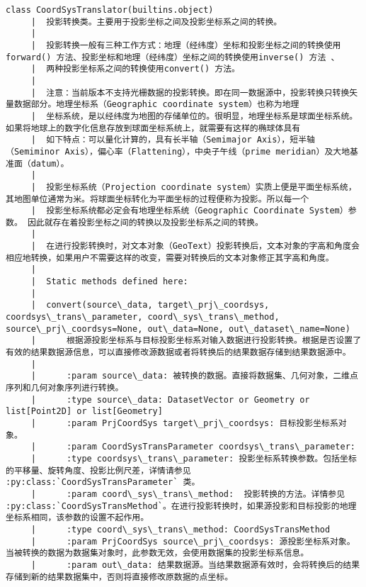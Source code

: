 \documentclass[11pt]{article}
\begin{document}
\begin{Verbatim}[commandchars=\\\{\}]
    class CoordSysTranslator(builtins.object)
     |  投影转换类。主要用于投影坐标之间及投影坐标系之间的转换。
     |  
     |  投影转换一般有三种工作方式：地理（经纬度）坐标和投影坐标之间的转换使用 forward() 方法、投影坐标和地理（经纬度）坐标之间的转换使用inverse() 方法 、
     |  两种投影坐标系之间的转换使用convert() 方法。
     |  
     |  注意：当前版本不支持光栅数据的投影转换。即在同一数据源中，投影转换只转换矢量数据部分。地理坐标系（Geographic coordinate system）也称为地理
     |  坐标系统，是以经纬度为地图的存储单位的。很明显，地理坐标系是球面坐标系统。如果将地球上的数字化信息存放到球面坐标系统上，就需要有这样的椭球体具有
     |  如下特点：可以量化计算的，具有长半轴（Semimajor Axis），短半轴（Semiminor Axis），偏心率（Flattening），中央子午线（prime meridian）及大地基准面（datum）。
     |  
     |  投影坐标系统（Projection coordinate system）实质上便是平面坐标系统，其地图单位通常为米。将球面坐标转化为平面坐标的过程便称为投影。所以每一个
     |  投影坐标系统都必定会有地理坐标系统（Geographic Coordinate System）参数。 因此就存在着投影坐标之间的转换以及投影坐标系之间的转换。
     |  
     |  在进行投影转换时，对文本对象（GeoText）投影转换后，文本对象的字高和角度会相应地转换，如果用户不需要这样的改变，需要对转换后的文本对象修正其字高和角度。
     |  
     |  Static methods defined here:
     |  
     |  convert(source\_data, target\_prj\_coordsys, coordsys\_trans\_parameter, coord\_sys\_trans\_method, source\_prj\_coordsys=None, out\_data=None, out\_dataset\_name=None)
     |      根据源投影坐标系与目标投影坐标系对输入数据进行投影转换。根据是否设置了有效的结果数据源信息，可以直接修改源数据或者将转换后的结果数据存储到结果数据源中。
     |      
     |      :param source\_data: 被转换的数据。直接将数据集、几何对象，二维点序列和几何对象序列进行转换。
     |      :type source\_data: DatasetVector or Geometry or list[Point2D] or list[Geometry]
     |      :param PrjCoordSys target\_prj\_coordsys: 目标投影坐标系对象。
     |      :param CoordSysTransParameter coordsys\_trans\_parameter:
     |      :type coordsys\_trans\_parameter: 投影坐标系转换参数。包括坐标的平移量、旋转角度、投影比例尺差，详情请参见 :py:class:`CoordSysTransParameter` 类。
     |      :param coord\_sys\_trans\_method:  投影转换的方法。详情参见 :py:class:`CoordSysTransMethod`。在进行投影转换时，如果源投影和目标投影的地理坐标系相同，该参数的设置不起作用。
     |      :type coord\_sys\_trans\_method: CoordSysTransMethod
     |      :param PrjCoordSys source\_prj\_coordsys: 源投影坐标系对象。当被转换的数据为数据集对象时，此参数无效，会使用数据集的投影坐标系信息。
     |      :param out\_data: 结果数据源。当结果数据源有效时，会将转换后的结果存储到新的结果数据集中，否则将直接修改原数据的点坐标。

\end{Verbatim}
\end{document}
